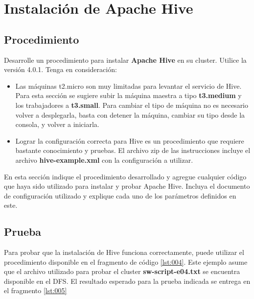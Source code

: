 \documentclass[12pt,letterpaper,twoside]{article}
\begin{document}
\section{Instalación de Apache Hive}

\subsection{Procedimiento}

{\color{red} Desarrolle un procedimiento para instalar \textbf{Apache Hive} en su cluster. Utilice la versión 4.0.1. Tenga en consideración:
\begin{itemize}
    \item Las máquinas t2.micro son muy limitadas para levantar el servicio de Hive. Para esta sección se sugiere subir la máquina maestra a tipo \textbf{t3.medium} y los trabajadores a \textbf{t3.small}. Para cambiar el tipo de máquina no es necesario volver a desplegarla, basta con detener la máquina, cambiar su tipo desde la consola, y volver a iniciarla.
    \item Lograr la configuración correcta para Hive es un procedimiento que requiere bastante conocimiento y pruebas. El archivo zip de las instrucciones incluye el archivo \textbf{hive-example.xml} con la configuración a utilizar.
\end{itemize}}

{\color{red} En esta sección indique el procedimiento desarrollado y agregue cualquier código que haya sido utilizado para instalar y probar Apache Hive. Incluya el documento de configuración utilizado y explique cada uno de los parámetros definidos en este.}

\subsection{Prueba}

{\color{red} Para probar que la instalación de Hive funciona correctamente, puede utilizar el procedimiento disponible en el fragmento de código \ref{lst:004}. Este ejemplo asume que el archivo utilizado para probar el cluster \textbf{sw-script-e04.txt} se encuentra disponible en el DFS. El resultado esperado para la prueba indicada se entrega en el fragmento \ref{lst:005}}

\begin{code}[H]

\end{code}
\end{document}
